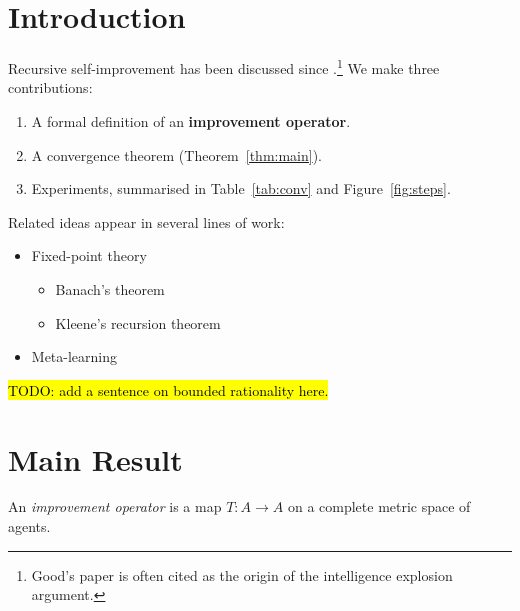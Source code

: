 
\begin{abstract}
We study when an agent that improves its own improvement procedure converges. Our main result gives a sufficient condition in terms of a contraction constant \(\lambda < 1\), and we show the bound is tight.
\end{abstract}

\section{Introduction}\label{sec:intro}

Recursive self-improvement has been discussed since \citet{good1965}.\footnote{Good's paper is often cited as the origin of the intelligence explosion argument.} We make three contributions:

\begin{enumerate}
\item A formal definition of an \textbf{improvement operator}.
\item A convergence theorem (Theorem~\ref{thm:main}).
\item Experiments, summarised in Table~\ref{tab:conv} and Figure~\ref{fig:steps}.
\end{enumerate}

Related ideas appear in several lines of work:
\begin{itemize}
\item Fixed-point theory
  \begin{itemize}
  \item Banach's theorem
  \item Kleene's recursion theorem
  \end{itemize}
\item Meta-learning %
\end{itemize}

\hl{TODO: add a sentence on bounded rationality here.}

\section{Main Result}\label{sec:main}

\begin{definition}
An \emph{improvement operator} is a map \(T:A \rightarrow A\) on a complete metric space of agents.
\end{definition}

